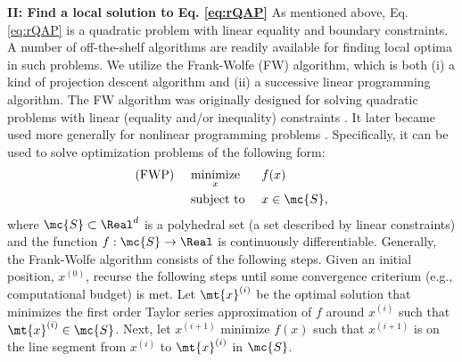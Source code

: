 \documentclass[10pt,journal,cspaper,compsoc]{IEEEtran}
\begin{document}
\textbf{II: Find a local solution to Eq. \eqref{eq:rQAP}} As mentioned above, Eq. \eqref{eq:rQAP} is a quadratic problem with linear equality and boundary constraints.  A number of off-the-shelf algorithms are readily available for finding local optima in such problems.  We utilize the Frank-Wolfe (FW) algorithm, which is both (i) a kind of projection descent algorithm
and (ii) a successive linear programming algorithm.  The FW algorithm was originally designed for solving quadratic problems with linear (equality and/or inequality) constraints \cite{Frank1956}. It later became used more generally for nonlinear programming problems  \cite{Bradley1977}.  Specifically, it can be used to solve optimization problems of the following form:
\begin{subequations} \label{eq:FW}
\begin{align}
		\text{(FWP) } \quad &\underset{x}{\text{minimize}}  && f(x)  \\
		&\text{subject to } && x \in \mc{S},
\end{align}
\end{subequations}
where $\mc{S} \subset \Real^d$ is a polyhedral set (a set described by linear constraints) and the function $f: \mc{S} \to \Real$ is continuously differentiable.  Generally, the Frank-Wolfe algorithm consists of the following steps.  Given an initial position, $x^{(0)}$, recurse the following steps until some convergence criterium (e.g., computational budget) is met.  Let $\mt{x}^{(i)}$ be the optimal solution that minimizes the first order Taylor series approximation of $f$ around $x^{(i)}$ such that  $\mt{x}^{(i)} \in \mc{S}$.  Next, let $x^{(i+1)}$ minimize $f(x)$ such that $x^{(i+1)}$ is on the line segment from $x^{(i)}$ to $\mt{x}^{(i)}$ in $\mc{S}$.  
\end{document}
